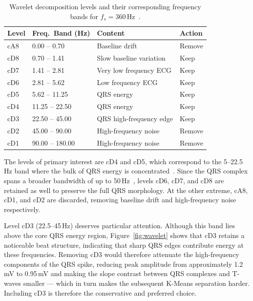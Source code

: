 \documentclass[11pt]{article}
\begin{document}
\begin{table}[htbp]
    \centering
    \caption{Wavelet decomposition levels and their corresponding frequency bands for $f_s = 360$\,Hz~\cite{sharma_qrs_2017, zidelmal_qrs_2012}.}
    \label{tab:wavelet-levels}
    \begin{tabular}{llll}
        \toprule
        \textbf{Level} & \textbf{Freq.\ Band (Hz)} & \textbf{Content} & \textbf{Action} \\
        \midrule
        cA8 & 0.00 -- 0.70   & Baseline drift          & Remove \\
        cD8 & 0.70 -- 1.41   & Slow baseline variation & Keep   \\
        cD7 & 1.41 -- 2.81   & Very low frequency ECG  & Keep   \\
        cD6 & 2.81 -- 5.62   & Low frequency ECG       & Keep   \\ 
        cD5 & 5.62 -- 11.25  & QRS energy              & Keep   \\
        cD4 & 11.25 -- 22.50 & QRS energy              & Keep   \\
        cD3 & 22.50 -- 45.00 & QRS high-frequency edge & Keep   \\
        cD2 & 45.00 -- 90.00 & High-frequency noise    & Remove \\
        cD1 & 90.00 -- 180.00 & High-frequency noise   & Remove \\
        \bottomrule
    \end{tabular}
\end{table}

The levels of primary interest are cD4 and cD5, which correspond to the 5--22.5\,Hz band where the bulk of QRS energy is concentrated~\cite{sharma_qrs_2017, zidelmal_qrs_2012}. Since the QRS complex spans a broader bandwidth of up to 50\,Hz~\cite{tereshchenko_frequency_2015}, levels cD6, cD7, and cD8 are retained as well to preserve the full QRS morphology. At the other extreme, cA8, cD1, and cD2 are discarded, removing baseline drift and high-frequency noise respectively.

Level cD3 (22.5--45\,Hz) deserves particular attention. Although this band lies above the core QRS energy region, Figure~\ref{fig:wavelet} shows that cD3 retains a noticeable beat structure, indicating that sharp QRS edges contribute energy at these frequencies. Removing cD3 would therefore attenuate the high-frequency components of the QRS spike, reducing peak amplitude from approximately 1.2\,mV to 0.95\,mV and making the slope contrast between QRS complexes and T-waves smaller — which in turn makes the subsequent K-Means separation harder. Including cD3 is therefore the conservative and preferred choice.
\end{document}
